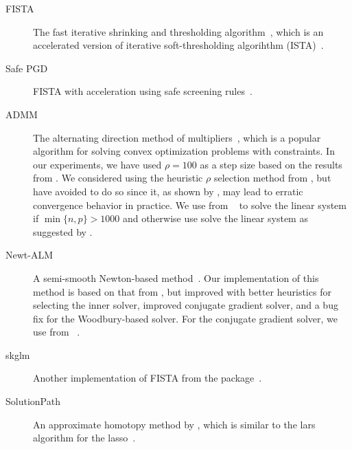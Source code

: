 \documentclass[article]{jss}
\begin{document}
\begin{appendix}
\begin{description}
    \item[FISTA] The fast iterative shrinking and thresholding
          algorithm~\citep{beck2009}, which is an accelerated version of iterative
          soft-thresholding algorihthm (ISTA)~\citep{wright2009}.

    \item[Safe PGD] FISTA with acceleration using safe screening
          rules~\citep{elvira2023}.

    \item[ADMM] The alternating direction method of
          multipliers~\citep{glowinski1975,boyd2010}, which is a popular algorithm
          for solving convex optimization problems with constraints. In our experiments,
          we have used \(\rho = 100\) as a step size based on the
          results from \citet{larsson2023}.
          We considered using the heuristic \(\rho\) selection method from
          \citet{boyd2010}, but have avoided to do so since it, as shown by \citet{larsson2023},
          may lead to erratic convergence behavior in practice. We use 
          from ~\citep{virtanen2020} to solve the linear system if
          \(\min\{n, p\} > \num{1000}\) and otherwise use solve the linear system
          as suggested by \citet{boyd2010}.

    \item[Newt-ALM] A semi-smooth Newton-based method~\citep{luo2019}. Our
          implementation of this method is based on that from \citet{larsson2023},
          but improved with better heuristics for selecting the inner solver,
          improved conjugate gradient solver, and
          a bug fix for the Woodbury-based solver. For the conjugate gradient solver,
          we use  from ~\citep{virtanen2020}.

    \item[skglm] Another implementation of FISTA from the
           package~\citep{bertrand2022}.

    \item[SolutionPath] An approximate homotopy method by \citet{dupuis2024},
          which is similar to the lars algorithm for the lasso~\citep{efron2004}.
  \end{description}

\end{appendix}
\end{document}
